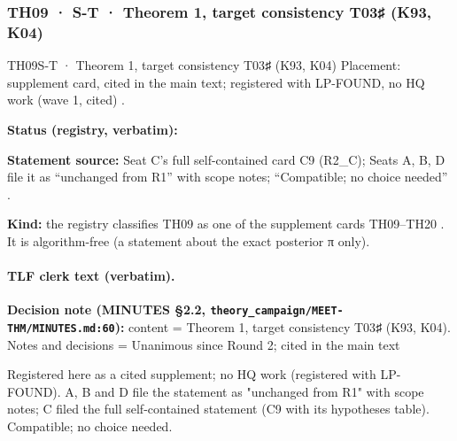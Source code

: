 \subsubsection{TH09 · S-T · Theorem 1, target consistency T03♯ (K93, K04)}\label{sec:th09}
\begin{card}{TH09}{S-T · Theorem 1, target consistency T03♯ (K93, K04)}
\approvedFB\quad Placement: supplement card, cited in the main text; registered with LP-FOUND, no HQ work (wave 1, cited) .\par
\textbf{Status (registry, verbatim):} \par
\textbf{Statement source:} Seat C's full self-contained card C9 (R2\_C); Seats A, B, D file it as ``unchanged from R1'' with scope notes; ``Compatible; no choice needed'' .\par
\textbf{Kind:} the registry classifies TH09 as one of the supplement cards TH09–TH20 . It is algorithm-free (a statement about the exact posterior π only).
\end{card}

\paragraph{TLF clerk text (verbatim).}
\par\noindent \textbf{Decision note (MINUTES §2.2, \texttt{theory\_campaign/MEET-THM/MINUTES.md:60}):} content = Theorem 1, target consistency T03♯ (K93, K04). Notes and decisions = Unanimous since Round 2; cited in the main text
\par\noindent Registered here as a cited supplement; no HQ work (registered with LP-FOUND). A, B and D file the statement as "unchanged from R1" with scope notes; C filed the full self-contained statement (C9 with its hypotheses table). Compatible; no choice needed.

